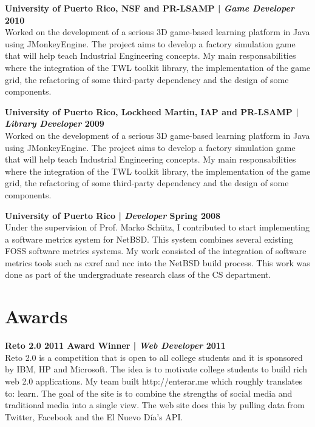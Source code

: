 \documentclass[margin,line]{res}
\begin{document}
\begin{resume}
{\bf University of Puerto Rico, NSF and PR-LSAMP | {\em Game Developer} \hfill {\bf 2010 \\} }
\vspace{-.01cm}
Worked on the development of a serious 3D game-based learning platform in Java using JMonkeyEngine. The project aims to develop a factory simulation game that will help teach Industrial Engineering concepts. My main responsabilities where the integration of the TWL toolkit library, the implementation of the game grid, the refactoring of some third-party dependency and the design of some components.

\clearpage

{\bf University of Puerto Rico, Lockheed Martin, IAP and PR-LSAMP | {\em Library Developer} \hfill {\bf 2009 \\} }
\vspace{-.01cm}
Worked on the development of a serious 3D game-based learning platform in Java using JMonkeyEngine. The project aims to develop a factory simulation game that will help teach Industrial Engineering concepts. My main responsabilities where the integration of the TWL toolkit library, the implementation of the game grid, the refactoring of some third-party dependency and the design of some components.

{\bf University of Puerto Rico | {\em Developer} \hfill {\bf Spring 2008 \\} }
\vspace{-.01cm}
Under the supervision of Prof. Marko Schütz, I contributed to start implementing a software metrics system for NetBSD. This system combines several existing FOSS software metrics systems. My work consisted of the integration of software metrics tools such as cxref and ncc into the NetBSD build process. This work was done as part of the undergraduate research class of the CS department.

\section{\sc Awards}

{\bf Reto 2.0 2011 Award Winner | {\em Web Developer} \hfill {\bf 2011 \\} }
\vspace{-.01cm}
Reto 2.0 is a competition that is open to all college students and it is sponsored by IBM, HP and Microsoft. The idea is to motivate college students to build rich web 2.0 applications. My team built http://enterar.me which roughly translates to: learn. The goal of the site is to combine the strengths of social media and traditional media into a single view. The web site does this by pulling data from Twitter, Facebook and the El Nuevo Día's API.


\end{resume}
\end{document}
